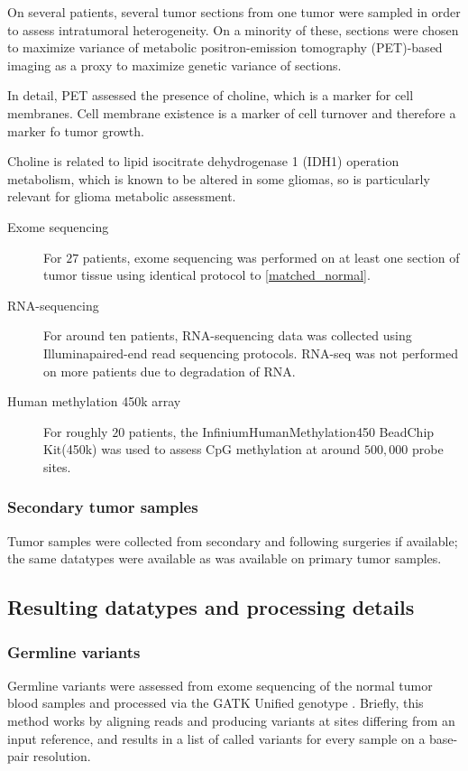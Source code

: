 On several patients, several tumor sections from one tumor were
sampled in order to assess intratumoral heterogeneity. On a minority
of these, sections were chosen to maximize variance of metabolic
positron-emission tomography (PET)-based imaging as a proxy to maximize genetic variance of sections.

In detail, PET assessed the presence of choline, which is a marker
for cell membranes. Cell membrane existence is a marker of cell
turnover and therefore a marker fo tumor growth.

Choline is related to lipid isocitrate dehydrogenase 1 (IDH1)
operation metabolism, which is known to be altered in some gliomas, so
is particularly relevant for glioma metabolic assessment. 

\begin{description}

\item[Exome sequencing] For $27$ patients, exome sequencing was
  performed on at least one section of tumor tissue using identical
  protocol to \ref{matched_normal}.

  
\item[RNA-sequencing] For around ten patients, RNA-sequencing data was
  collected using Illumina\reg paired-end read sequencing
  protocols. RNA-seq was not performed on more patients due to
  degradation of RNA.

  
\item[Human methylation 450k array] For roughly $20$ patients, the
  Infinium\reg HumanMethylation450 BeadChip Kit\tm (450k) was used to assess
  CpG methylation at around $500,000$ probe sites.
  
\end{description}


\subsubsection{Secondary tumor samples}

Tumor samples were collected from secondary and following surgeries if
available; the same datatypes were available as was available on
primary tumor samples.

\subsection{Resulting datatypes and processing details}
\subsubsection{Germline variants}
Germline variants were assessed from exome sequencing of the normal
tumor blood samples and processed via the GATK Unified genotype
. Briefly, this method works by aligning reads and
producing variants at sites differing from an input reference, and
results in a list of called variants for every sample on a base-pair
resolution.


